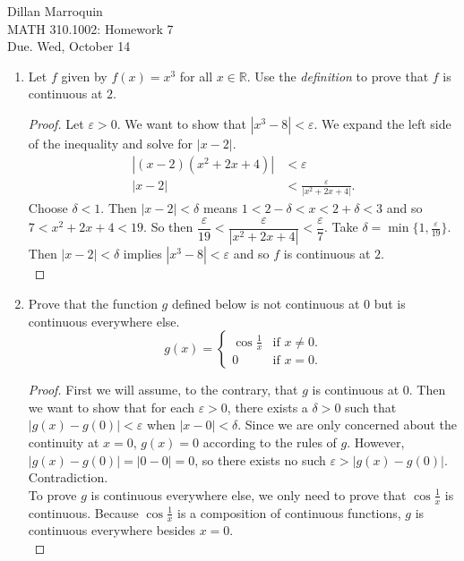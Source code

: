 \documentclass{article}
\begin{document}
    \noindent Dillan Marroquin\\ MATH 310.1002: Homework 7\\
    Due. Wed, October 14

    \begin{enumerate}
        \item Let $f$ given by $f(x) = x^3$ for all $x \in \mathbb{R}$. Use the \textit{definition} to prove that $f$ is continuous at $2$.
        \begin{proof}
            Let $\varepsilon > 0$. We want to show that $|x^3-8| < \varepsilon$. We expand the left side of the inequality and solve for $|x-2|$.
            \begin{align*}
                |(x-2)(x^2+2x+4)| &< \varepsilon\\
                |x-2| &< \frac{\varepsilon}{|x^2+2x+4|}.
            \end{align*}
        Choose $\delta < 1$. Then $|x-2| < \delta$ means $1 < 2-\delta < x < 2+\delta < 3$ and so $7 < x^2+2x+4 < 19$. So then $\dfrac{\varepsilon}{19} < \dfrac{\varepsilon}{|x^2+2x+4|} < \dfrac{\varepsilon}{7}$. Take $\delta = \min\{1, \frac{\varepsilon}{19}\}$. Then $|x-2| < \delta$ implies $|x^3-8| < \varepsilon$ and so $f$ is continuous at $2$.\\
        \end{proof}
        
        \item Prove that the function $g$ defined below is not continuous at 0 but is continuous everywhere else.
            \[g(x) = 
            \begin{cases} 
                \cos{\frac{1}{x}} & \text{if } x\neq 0.\\
                0 & \text{if } x=0.
            \end{cases}\]
        \begin{proof}
            First we will assume, to the contrary, that $g$ is continuous at 0. Then we want to show that for each $\varepsilon > 0$, there exists a $\delta > 0$ such that $|g(x) - g(0)| < \varepsilon$ when $|x-0| < \delta$. Since we are only concerned about the continuity at $x=0$, $g(x) = 0$ according to the rules of $g$.  However, $|g(x) - g(0)| = |0-0| = 0$, so there exists no such $\varepsilon > |g(x)-g(0)|$. Contradiction.\\
            To prove $g$ is continuous everywhere else, we only need to prove that $\cos{\frac{1}{x}}$ is continuous. Because $\cos{\frac{1}{x}}$ is a composition of continuous functions, $g$ is continuous everywhere besides $x = 0$.\\
        \end{proof}
        

\end{enumerate}
\end{document}
